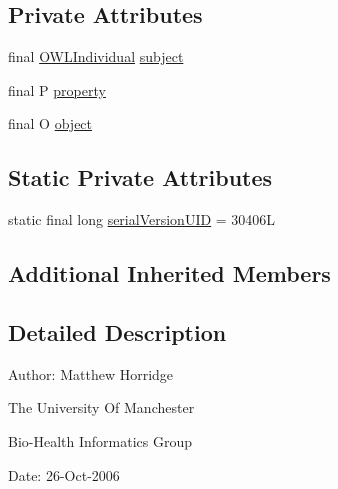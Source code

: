 \subsection*{Private Attributes}
\begin{DoxyCompactItemize}
\item 
final \hyperlink{interfaceorg_1_1semanticweb_1_1owlapi_1_1model_1_1_o_w_l_individual}{O\-W\-L\-Individual} \hyperlink{classuk_1_1ac_1_1manchester_1_1cs_1_1owl_1_1owlapi_1_1_o_w_l_individual_relationship_axiom_impl_2e65835829d24af56b0ce2178ea3b61b_a7b6b0d5f8fd1c18140958d21d7acb633}{subject}
\item 
final P \hyperlink{classuk_1_1ac_1_1manchester_1_1cs_1_1owl_1_1owlapi_1_1_o_w_l_individual_relationship_axiom_impl_2e65835829d24af56b0ce2178ea3b61b_a591aa119d05452dd487de9ddcb44f010}{property}
\item 
final O \hyperlink{classuk_1_1ac_1_1manchester_1_1cs_1_1owl_1_1owlapi_1_1_o_w_l_individual_relationship_axiom_impl_2e65835829d24af56b0ce2178ea3b61b_aa3a374ed0574781ffd25ac99e8ffc40a}{object}
\end{DoxyCompactItemize}
\subsection*{Static Private Attributes}
\begin{DoxyCompactItemize}
\item 
static final long \hyperlink{classuk_1_1ac_1_1manchester_1_1cs_1_1owl_1_1owlapi_1_1_o_w_l_individual_relationship_axiom_impl_2e65835829d24af56b0ce2178ea3b61b_ad0434b11d400c74391f86a32726b4360}{serial\-Version\-U\-I\-D} = 30406\-L
\end{DoxyCompactItemize}
\subsection*{Additional Inherited Members}


\subsection{Detailed Description}
Author\-: Matthew Horridge\par
 The University Of Manchester\par
 Bio-\/\-Health Informatics Group\par
 Date\-: 26-\/\-Oct-\/2006\par
\par



